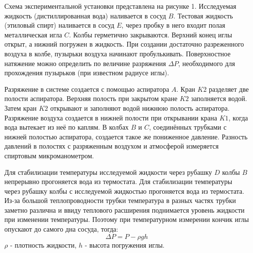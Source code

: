 \documentclass[a4paper,12pt]{article}
\begin{document}
	Схема экспериментальной установки представлена на рисунке 1. Исследуемая жидкость (дистиллированная вода) наливается в сосуд $B$. Тестовая жидкость (этиловый спирт) наливается в сосуд $E$, через пробку в него входит полая металлическая игла $C$. Колбы герметично закрываются. Верхний конец иглы открыт, а нижний погружен в жидкость. При создании достаточно разреженного воздуха в колбе, пузырьки воздуха начинают пробулькивать. Поверхностное натяжение можно определить по величине разряжения $\Delta P$, необходимого для прохождения пузырьков (при известном радиусе иглы).
	
	\quad Разряжение в системе создается с помощью аспиратора $A$. Кран $K2$ разделяет две полости аспиратора. Верхняя полость при закрытом кране $K2$ заполняется водой. Затем кран $K2$ открывают и заполняют водой нижнюю полость  аспиратора. Разряжение воздуха создается в нижней полости при открывании крана $K1$, когда  вода вытекает из неё по каплям. В колбах $B$ и $C$, соединённых трубками с нижней полостью аспиратора, создается такое же пониженное давление. Разность давлений в полостях с разряженным воздухом и атмосферой измеряется спиртовым микроманометром.
	
	\quad Для стабилизации температуры исследуемой жидкости через рубашку $D$ колбы $B$ непрерывно прогоняется вода из термостата. 	Для стабилизации температуры через рубашку колбы с исследуемой жидкостью прогоняется вода из термостата. Из-за большой теплопроводности трубки температура в разных частях трубки заметно различна и ввиду теплового расширения поднимается уровень жидкости при изменении температуры. Поэтому при температурном измерении кончик иглы опускают до самого дна сосуда, тогда:
	\begin{equation}
		\Delta P = P - \rho g h
	\end{equation}
	$\rho$ - плотность жидкости, $h$ - высота погружения иглы.
	
\end{document}
